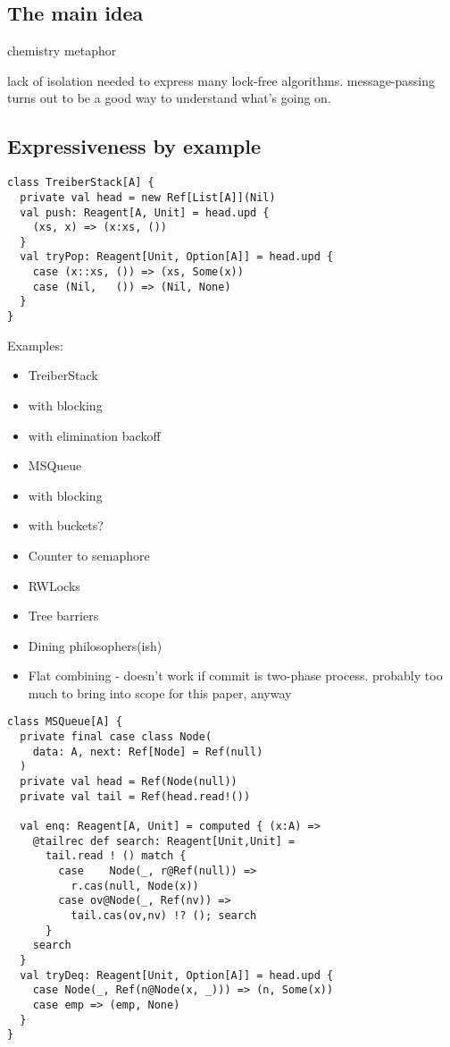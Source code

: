 \documentclass[preprint]{sigplanconf}
\begin{document}
\subsection{The main idea}


 
chemistry metaphor

lack of isolation needed to express many lock-free algorithms.
message-passing turns out to be a good way to understand what's going on.

\subsection{Expressiveness by example}

\begin{lstlisting}
class TreiberStack[A] {
  private val head = new Ref[List[A]](Nil)
  val push: Reagent[A, Unit] = head.upd {
    (xs, x) => (x:xs, ())
  }
  val tryPop: Reagent[Unit, Option[A]] = head.upd {
    case (x::xs, ()) => (xs, Some(x))
    case (Nil,   ()) => (Nil, None)
  }
}
\end{lstlisting}

Examples:

\begin{itemize}
\item TreiberStack
\item with blocking
\item with elimination backoff
\item MSQueue
\item with blocking
\item with buckets?
\item Counter to semaphore
\item RWLocks
\item Tree barriers
\item Dining philosophers(ish)
\item Flat combining - doesn't work if commit is two-phase process.
  probably too much to bring into scope for this paper, anyway
\end{itemize}

\begin{lstlisting}
class MSQueue[A] {
  private final case class Node(
    data: A, next: Ref[Node] = Ref(null)
  )
  private val head = Ref(Node(null))
  private val tail = Ref(head.read!())

  val enq: Reagent[A, Unit] = computed { (x:A) =>
    @tailrec def search: Reagent[Unit,Unit] = 
      tail.read ! () match {
        case    Node(_, r@Ref(null)) => 
          r.cas(null, Node(x))
        case ov@Node(_, Ref(nv)) => 
          tail.cas(ov,nv) !? (); search
      }
    search
  }
  val tryDeq: Reagent[Unit, Option[A]] = head.upd {
    case Node(_, Ref(n@Node(x, _))) => (n, Some(x))
    case emp => (emp, None)
  }
}
\end{lstlisting}
\end{document}
